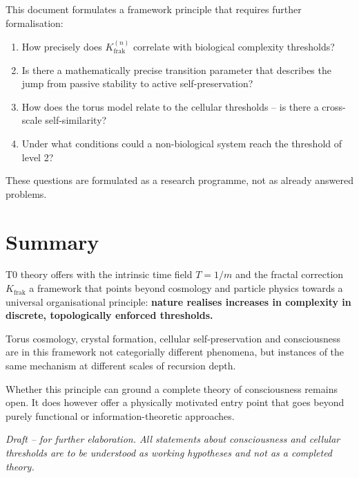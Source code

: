 	This document formulates a framework principle that requires further formalisation:
	\begin{enumerate}
		\item How precisely does $K_{\text{frak}}^{(n)}$ correlate with biological complexity thresholds?
		\item Is there a mathematically precise transition parameter that describes the jump from passive stability to active self-preservation?
		\item How does the torus model relate to the cellular thresholds -- is there a cross-scale self-similarity?
		\item Under what conditions could a non-biological system reach the threshold of level 2?
	\end{enumerate}
	
	These questions are formulated as a research programme, not as already answered problems.
	
	\section{Summary}
	
	T0 theory offers with the intrinsic time field $T = 1/m$ and the fractal correction $K_{\text{frak}}$ a framework that points beyond cosmology and particle physics towards a universal organisational principle: \textbf{nature realises increases in complexity in discrete, topologically enforced thresholds.}
	
	Torus cosmology, crystal formation, cellular self-preservation and consciousness are in this framework not categorially different phenomena, but instances of the same mechanism at different scales of recursion depth.
	
	Whether this principle can ground a complete theory of consciousness remains open. It does however offer a physically motivated entry point that goes beyond purely functional or information-theoretic approaches.
	
	\vspace{1cm}
	\noindent
	\textit{Draft -- for further elaboration. All statements about consciousness and cellular thresholds are to be understood as working hypotheses and not as a completed theory.}
